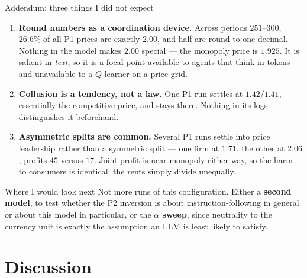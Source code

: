\documentclass[aspectratio=169,9pt]{beamer}
\newcommand{\orange}[1]{\textcolor{AmazonOrange}{\textbf{#1}}}
\newcommand{\blue}[1]{\textcolor{densityblue}{\textbf{#1}}}
\newcommand{\green}[1]{\textcolor{deepgreen}{\textbf{#1}}}
\begin{document}
\begin{frame}{Addendum: three things I did not expect}
\begin{enumerate}
    \item \orange{Round numbers as a coordination device.} Across periods $251$--$300$, \textbf{$26.6\%$} of
    all P1 prices are exactly $2.00$, and half are round to one decimal. Nothing in the model makes $2.00$
    special --- the monopoly price is $1.925$. It is salient in \textit{text}, so it is a focal point available
    to agents that think in tokens and unavailable to a $Q$-learner on a price grid.
    \pause
    \vspace{0.15cm}
    \item \blue{Collusion is a tendency, not a law.} One P1 run settles at $1.42/1.41$, essentially the
    competitive price, and stays there. Nothing in its logs distinguishes it beforehand.
    \pause
    \vspace{0.15cm}
    \item \green{Asymmetric splits are common.} Several P1 runs settle into price leadership rather than a
    symmetric split --- one firm at $1.71$, the other at $2.06$, profits $45$ versus $17$. Joint profit is
    near-monopoly either way, so the harm to consumers is identical; the rents simply divide unequally.
\end{enumerate}
\pause
\vspace{0.1cm}
\begin{block}{Where I would look next}
Not more runs of this configuration. Either a \orange{second model}, to test whether the P2 inversion is about
instruction-following in general or about this model in particular, or the \blue{$\alpha$ sweep}, since
neutrality to the currency unit is exactly the assumption an LLM is least likely to satisfy.
\end{block}
\end{frame}

\section{Discussion}
\end{document}
